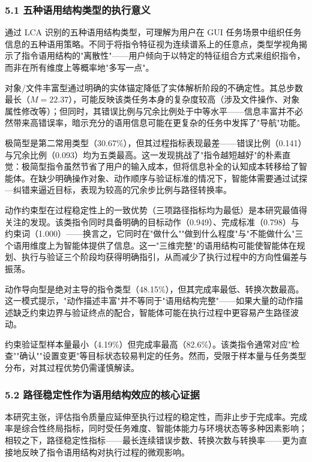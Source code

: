 \documentclass[12pt,a4paper,openany,oneside]{ctexrep}
\begin{document}
\subsubsection{5.1 五种语用结构类型的执行意义}


通过 LCA 识别的五种语用结构类型，可理解为用户在 GUI 任务场景中组织任务信息的五种语用策略。不同于将指令特征视为连续谱系上的任意点，类型学视角揭示了指令语用结构的"离散性"——用户倾向于以特定的特征组合方式来组织指令，而非在所有维度上等概率地"多写一点"。

对象/文件丰富型通过明确的实体锚定降低了实体解析阶段的不确定性。其总步数最长（$M=22.37$），可能反映该类任务本身的复杂度较高（涉及文件操作、对象属性修改等）；但同时，其错误比例与冗余比例处于中等水平——信息丰富并不必然带来高错误率，暗示充分的语用信息可能在更复杂的任务中发挥了"导航"功能。

极简型是第二常用类型（30.67\%），但其过程指标表现最差——错误比例（0.141）与冗余比例（0.093）均为五类最高。这一发现挑战了"指令越短越好"的朴素直觉：极简型指令虽然节省了用户的输入成本，但将信息补全的认知成本转移给了智能体。在缺少明确操作对象、动作顺序与验证标准的情况下，智能体需要通过试探—纠错来逼近目标，表现为较高的冗余步比例与路径转换率。

动作约束型在过程稳定性上的一致优势（三项路径指标均为最低）是本研究最值得关注的发现。该类指令同时具备明确的目标动作（0.949）、完成标准（0.798）与约束词（1.000）——换言之，它同时在"做什么""做到什么程度"与"不能做什么"三个语用维度上为智能体提供了信息。这一"三维完整"的语用结构可能使智能体在规划、执行与验证三个阶段均获得明确指引，从而减少了执行过程中的方向性偏差与振荡。

动作导向型是绝对主导的指令类型（48.15\%），但其完成率最低、转换次数最高。这一模式提示，"动作描述丰富"并不等同于"语用结构完整"——如果大量的动作描述缺乏约束边界与验证终点的配合，智能体可能在执行过程中更容易产生路径波动。

约束验证型样本量最小（4.19\%）但完成率最高（82.6\%）。该类指令通常对应"检查""确认""设置变更"等目标状态较易判定的任务。然而，受限于样本量与任务类型分布，对其过程优势仍需谨慎解读。

\subsubsection{5.2 路径稳定性作为语用结构效应的核心证据}


本研究主张，评估指令质量应延伸至执行过程的稳定性，而非止步于完成率。完成率是综合性终局指标，同时受任务难度、智能体能力与环境状态等多种因素影响；相较之下，路径稳定性指标——最长连续错误步数、转换次数与转换率——更为直接地反映了指令语用结构对执行过程的微观影响。
\end{document}
